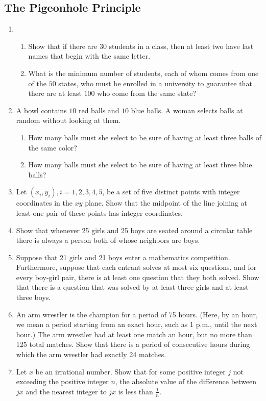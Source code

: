 \documentclass{../../cls/sig-alternate-05-2015}
\begin{document}
\subsection{The Pigeonhole Principle}
\begin{enumerate}
    \item \begin{enumerate}
        \item Show that if there are $30$ students in a class, then at least
        two have last names that begin with the same letter.
        
        \item What is the minimum number of students, each of whom
        comes from one of the $50$ states, who must be enrolled in
        a university to guarantee that there are at least $100$ who
        come from the same state?
    \end{enumerate}

    \item A bowl contains $10$ red balls and $10$ blue balls. A woman
    selects balls at random without looking at them.
    \begin{enumerate}
    \item How many balls must she select to be sure of having
    at least three balls of the same color?
    \item How many balls must she select to be sure of having
    at least three blue balls?
    \end{enumerate}

    \item Let $(x_i, y_i), i = 1, 2, 3, 4, 5$, be a set of five distinct points with integer coordinates in the $xy$ plane. Show that the
    midpoint of the line joining at least one pair of these points has integer coordinates.
    
    \item Show that whenever 25 girls and 25 boys are seated around a circular table there is always a person both of whose neighbors are boys.
    
    \item Suppose that 21 girls and 21 boys enter a mathematics competition. Furthermore, suppose that each entrant solves at most six questions, and for every boy-girl pair, there is at least one question that they both solved. Show that there is a question that was solved by at least three girls and at least three boys.
    
    \item An arm wrestler is the champion for a period of 75 hours. (Here, by an hour, we mean a period starting from an exact hour, such as 1 p.m., until the next hour.) The arm wrestler had at least one match an hour, but no more than 125 total matches. Show that there is a period of consecutive hours during which the arm wrestler had exactly 24 matches.
    
    \item Let $x$ be an irrational number. Show that for some positive integer $j$ not exceeding the positive integer $n$, the absolute value of the difference between $jx$ and the nearest integer to $jx$ is less than $\frac{1}{n}$.
\end{enumerate}
\end{document}

